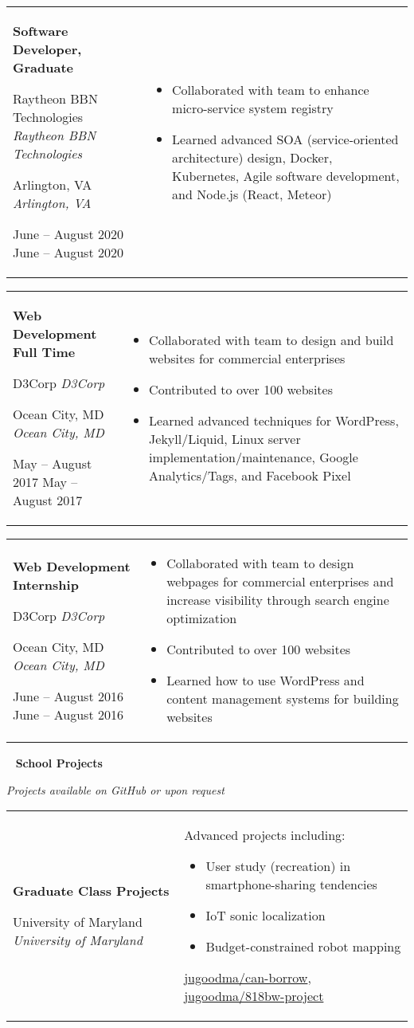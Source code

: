 \documentclass[11pt,letterpaper]{article}
\newcommand{\sect}[1]{
\begin{center}
	\noindent\xrfill[0.7ex]{0.5pt} \mbox{ } {\Large \bf #1} \mbox{ } \xrfill[0.7ex]{0.5pt}
\end{center}
}
\newcommand{\entry}[5]{
	\noindent
	\begin{tabular}{p{2in} p{\dimexpr \linewidth-2\tabcolsep-2.25in}} %
		\noindent \textbf{#1}
		
		\ifx #2  \else \noindent \textit{#2} \fi
		
		\ifx #3  \else \noindent \textit{#3} \fi
		
		\ifx #4  \else \noindent #4 \fi
		&
		#5
	\end{tabular}
	\vspace{0.5cm}
}
\begin{document}
	\entry{Software Developer, Graduate}{Raytheon BBN Technologies}{Arlington, VA}{June -- August 2020}{
		\vspace{-5mm}
		\begin{itemize}[itemsep=0pt, wide]
			\item Collaborated with team to enhance micro-service system registry
			\item Learned advanced SOA (service-oriented architecture) design, Docker, Kubernetes, Agile software development, and Node.js (React, Meteor)
		\end{itemize}
	}
	
	\entry{Web Development Full Time}{D3Corp}{Ocean City, MD}{May -- August 2017}{
		\vspace{-5mm}
		\begin{itemize}[itemsep=0pt, wide]
			\item Collaborated with team to design and build websites for commercial enterprises
			\item Contributed to over 100 websites
			\item Learned advanced techniques for WordPress, Jekyll/Liquid, Linux server implementation/maintenance, Google Analytics/Tags, and Facebook Pixel
		\end{itemize}
	}
	
	\entry{Web Development Internship}{D3Corp}{Ocean City, MD}{June -- August 2016}{
		\vspace{-5mm}
		\begin{itemize}[itemsep=0pt, wide]
			\item Collaborated with team to design webpages for commercial enterprises and increase visibility through search engine optimization
			\item Contributed to over 100 websites
			\item Learned how to use WordPress and content management systems for building websites
		\end{itemize}
	}
	
	\sect{School Projects}
	
	\vspace*{-0.5cm}
	\begin{center}
		{\small \textit{Projects available on GitHub or upon request}}
	\end{center}
	
	\entry{Graduate Class Projects}{University of Maryland}{}{}{
		Advanced projects including:
		\begin{itemize}[nosep, wide]
			\item User study (recreation) in smartphone-sharing tendencies
			\item IoT sonic localization
			\item Budget-constrained robot mapping
		\end{itemize}
		
		\href{https://github.com/jugoodma/can-borrow}{jugoodma/can-borrow},
		\href{https://github.com/jugoodma/818bw-project}{jugoodma/818bw-project}
	}
	
\end{document}
